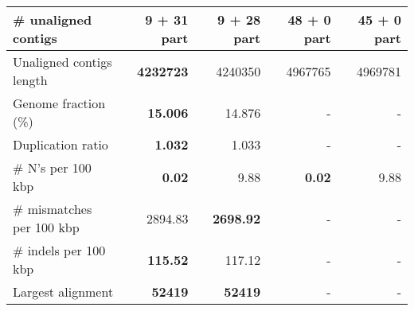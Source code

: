 \documentclass[12pt,a4paper]{article}
\begin{document}
\begin{table}[ht]
\begin{center}
\begin{tabular}{|l*{4}{|r}|}
\# unaligned contigs & 9 + 31 part & 9 + 28 part & 48 + 0 part & {\bf 45 + 0 part} \\ \hline
Unaligned contigs length & {\bf 4232723} & 4240350 & 4967765 & 4969781 \\ \hline
Genome fraction (\%) & {\bf 15.006} & 14.876 & - & - \\ \hline
Duplication ratio & {\bf 1.032} & 1.033 & - & - \\ \hline
\# N's per 100 kbp & {\bf 0.02} & 9.88 & {\bf 0.02} & 9.88 \\ \hline
\# mismatches per 100 kbp & 2894.83 & {\bf 2698.92} & - & - \\ \hline
\# indels per 100 kbp & {\bf 115.52} & 117.12 & - & - \\ \hline
Largest alignment & {\bf 52419} & {\bf 52419} & - & - \\ \hline
\end{tabular}
\end{center}
\end{table}
\end{document}

